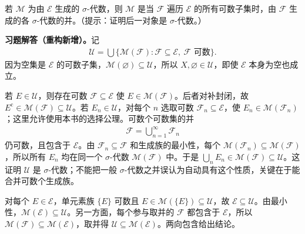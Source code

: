 \documentclass[../../main.tex]{subfiles}%
\begin{document}
\begin{exercise}\label{exercise:ch01-countable-generators}
若 $\mathscr{M}$ 为由 $\mathscr{E}$ 生成的 $\sigma$-代数，则 $\mathscr{M}$ 是当 $\mathscr{F}$ 遍历 $\mathscr{E}$ 的所有可数子集时，由 $\mathscr{F}$ 生成的各 $\sigma$-代数的并。（提示：证明后一对象是 $\sigma$-代数。）
\end{exercise}
\begin{solution}
\label{solution:ch01-countable-generators}
\textbf{习题解答（重构新增）。}记
\begin{align*}
\mathscr{U}=\bigcup\{\mathscr{M}(\mathscr{F}):
\mathscr{F}\subseteq\mathscr{E},\ \mathscr{F}\text{ 可数}\}.
\end{align*}
因为空集是 $\mathscr{E}$ 的可数子集，$\mathscr{M}(\varnothing)\subseteq\mathscr{U}$，所以 $X,\varnothing\in\mathscr{U}$，即使 $\mathscr{E}$ 本身为空也成立。

若 $E\in\mathscr{U}$，则存在可数 $\mathscr{F}\subseteq\mathscr{E}$ 使 $E\in\mathscr{M}(\mathscr{F})$。后者对补封闭，故 $E^{\mathrm c}\in\mathscr{M}(\mathscr{F})\subseteq\mathscr{U}$。若 $E_n\in\mathscr{U}$，对每个 $n$ 选取可数 $\mathscr{F}_n\subseteq\mathscr{E}$，使 $E_n\in\mathscr{M}(\mathscr{F}_n)$；这里允许使用本书的选择公理。可数个可数集的并
\begin{align*}
\mathscr{F}=\bigcup_{n=1}^{\infty}\mathscr{F}_n
\end{align*}
仍可数，且包含于 $\mathscr{E}$。由 $\mathscr{F}_n\subseteq\mathscr{F}$ 和生成族的最小性，每个 $\mathscr{M}(\mathscr{F}_n)\subseteq\mathscr{M}(\mathscr{F})$，所以所有 $E_n$ 均在同一个 $\sigma$-代数 $\mathscr{M}(\mathscr{F})$ 中。于是 $\bigcup_nE_n\in\mathscr{M}(\mathscr{F})\subseteq\mathscr{U}$。这证明 $\mathscr{U}$ 是 $\sigma$-代数；不能把一般 $\sigma$-代数之并误认为自动具有这个性质，关键在于能合并可数个生成族。

对每个 $E\in\mathscr{E}$，单元素族 $\{E\}$ 可数且 $E\in\mathscr{M}(\{E\})\subseteq\mathscr{U}$，故 $\mathscr{E}\subseteq\mathscr{U}$。由最小性，$\mathscr{M}(\mathscr{E})\subseteq\mathscr{U}$。另一方面，每个参与取并的 $\mathscr{F}$ 都包含于 $\mathscr{E}$，所以 $\mathscr{M}(\mathscr{F})\subseteq\mathscr{M}(\mathscr{E})$，取并得 $\mathscr{U}\subseteq\mathscr{M}(\mathscr{E})$。两向包含给出结论。
\end{solution}
\end{document}
